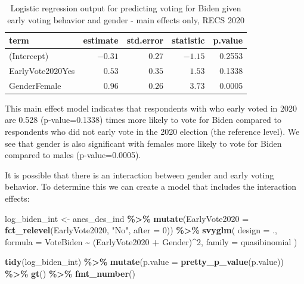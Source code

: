 \documentclass[
]{krantz}
\makeatletter
\newenvironment{Shaded}{\begin{snugshade}}{\end{snugshade}}
\newcommand{\AttributeTok}[1]{\textcolor[rgb]{0.27,0.27,0.27}{#1}}
\newcommand{\DecValTok}[1]{\textcolor[rgb]{0.06,0.06,0.06}{#1}}
\newcommand{\FunctionTok}[1]{\textcolor[rgb]{0.27,0.27,0.27}{\textbf{#1}}}
\newcommand{\NormalTok}[1]{#1}
\newcommand{\OtherTok}[1]{\textcolor[rgb]{0.37,0.37,0.37}{#1}}
\newcommand{\SpecialCharTok}[1]{\textcolor[rgb]{0.43,0.43,0.43}{\textbf{#1}}}
\newcommand{\StringTok}[1]{\textcolor[rgb]{0.5,0.5,0.5}{#1}}
\newenvironment{kframe}{%
\medskip{}
\setlength{\fboxsep}{.8em}
 \def\at@end@of@kframe{}%
 \ifinner\ifhmode%
  \def\at@end@of@kframe{\end{minipage}}%
  \begin{minipage}{\columnwidth}%
 \fi\fi%
 \def\FrameCommand##1{\hskip\@totalleftmargin \hskip-\fboxsep
 \colorbox{shadecolor}{##1}\hskip-\fboxsep
     \hskip-\linewidth \hskip-\@totalleftmargin \hskip\columnwidth}%
 \MakeFramed {\advance\hsize-\width
   \@totalleftmargin\z@ \linewidth\hsize
   \@setminipage}}%
 {\par\unskip\endMakeFramed%
 \at@end@of@kframe}
\renewenvironment{Shaded}{\begin{kframe}}{\end{kframe}}
\makeatother
\begin{document}
\begin{longtable}{lrrrr}
\caption{\label{tab:model-logisticexamp-biden-main-tab}Logistic regression output for predicting voting for Biden given early voting behavior and gender - main effects only, RECS 2020}\\
\toprule
term & estimate & std.error & statistic & p.value \\ 
\midrule\relax
(Intercept) & $-0.31$ & $0.27$ & $-1.15$ & 0.2553 \\ 
EarlyVote2020Yes & $0.53$ & $0.35$ & $1.53$ & 0.1338 \\ 
GenderFemale & $0.96$ & $0.26$ & $3.73$ & 0.0005 \\ 
\bottomrule
\end{longtable}

This main effect model indicates that respondents with who early voted in 2020 are 0.528 (p-value=0.1338) times more likely to vote for Biden compared to respondents who did not early vote in the 2020 election (the reference level). We see that gender is also significant with females more likely to vote for Biden compared to males (p-value=0.0005).

It is possible that there is an interaction between gender and early voting behavior. To determine this we can create a model that includes the interaction effects:

\begin{Shaded}
\begin{Highlighting}[]
\NormalTok{log\_biden\_int }\OtherTok{\textless{}{-}}\NormalTok{ anes\_des\_ind }\SpecialCharTok{\%\textgreater{}\%}
  \FunctionTok{mutate}\NormalTok{(}\AttributeTok{EarlyVote2020 =} \FunctionTok{fct\_relevel}\NormalTok{(EarlyVote2020, }\StringTok{"No"}\NormalTok{, }\AttributeTok{after =} \DecValTok{0}\NormalTok{)) }\SpecialCharTok{\%\textgreater{}\%}
  \FunctionTok{svyglm}\NormalTok{(}
    \AttributeTok{design =}\NormalTok{ .,}
    \AttributeTok{formula =}\NormalTok{ VoteBiden }\SpecialCharTok{\textasciitilde{}}\NormalTok{ (EarlyVote2020 }\SpecialCharTok{+}\NormalTok{ Gender)}\SpecialCharTok{\^{}}\DecValTok{2}\NormalTok{,}
    \AttributeTok{family =}\NormalTok{ quasibinomial}
\NormalTok{  )}
\end{Highlighting}
\end{Shaded}

\begin{Shaded}
\begin{Highlighting}[]
\FunctionTok{tidy}\NormalTok{(log\_biden\_int) }\SpecialCharTok{\%\textgreater{}\%}
  \FunctionTok{mutate}\NormalTok{(}\AttributeTok{p.value =} \FunctionTok{pretty\_p\_value}\NormalTok{(p.value)) }\SpecialCharTok{\%\textgreater{}\%}
  \FunctionTok{gt}\NormalTok{() }\SpecialCharTok{\%\textgreater{}\%}
  \FunctionTok{fmt\_number}\NormalTok{()}
\end{Highlighting}
\end{Shaded}
\end{document}
